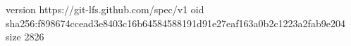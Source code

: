 version https://git-lfs.github.com/spec/v1
oid sha256:f898674ccead3e8403c16b64584588191d91e27eaf163a0b2c1223a2fab9e204
size 2826
